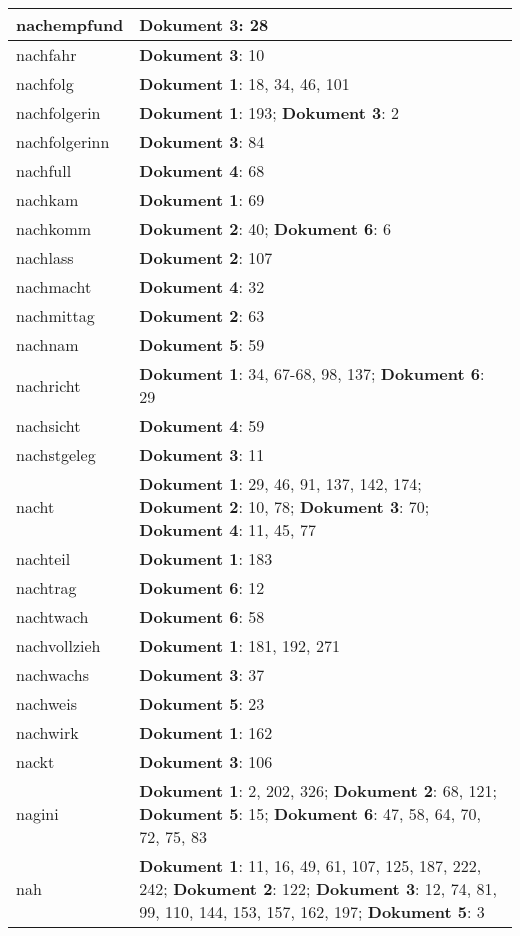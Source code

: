\documentclass[a5paper]{article}
\begin{document}
\begin{longtable}[l]{|l|p{3in}|}
\hline
nachempfund & \textbf{Dokument 3}: 28 \\
\hline
nachfahr & \textbf{Dokument 3}: 10 \\
\hline
nachfolg & \textbf{Dokument 1}: 18, 34, 46, 101 \\
\hline
nachfolgerin & \textbf{Dokument 1}: 193; \textbf{Dokument 3}: 2 \\
\hline
nachfolgerinn & \textbf{Dokument 3}: 84 \\
\hline
nachfull & \textbf{Dokument 4}: 68 \\
\hline
nachkam & \textbf{Dokument 1}: 69 \\
\hline
nachkomm & \textbf{Dokument 2}: 40; \textbf{Dokument 6}: 6 \\
\hline
nachlass & \textbf{Dokument 2}: 107 \\
\hline
nachmacht & \textbf{Dokument 4}: 32 \\
\hline
nachmittag & \textbf{Dokument 2}: 63 \\
\hline
nachnam & \textbf{Dokument 5}: 59 \\
\hline
nachricht & \textbf{Dokument 1}: 34, 67-68, 98, 137; \textbf{Dokument 6}: 29 \\
\hline
nachsicht & \textbf{Dokument 4}: 59 \\
\hline
nachstgeleg & \textbf{Dokument 3}: 11 \\
\hline
nacht & \textbf{Dokument 1}: 29, 46, 91, 137, 142, 174; \textbf{Dokument 2}: 10, 78; \textbf{Dokument 3}: 70; \textbf{Dokument 4}: 11, 45, 77 \\
\hline
nachteil & \textbf{Dokument 1}: 183 \\
\hline
nachtrag & \textbf{Dokument 6}: 12 \\
\hline
nachtwach & \textbf{Dokument 6}: 58 \\
\hline
nachvollzieh & \textbf{Dokument 1}: 181, 192, 271 \\
\hline
nachwachs & \textbf{Dokument 3}: 37 \\
\hline
nachweis & \textbf{Dokument 5}: 23 \\
\hline
nachwirk & \textbf{Dokument 1}: 162 \\
\hline
nackt & \textbf{Dokument 3}: 106 \\
\hline
nagini & \textbf{Dokument 1}: 2, 202, 326; \textbf{Dokument 2}: 68, 121; \textbf{Dokument 5}: 15; \textbf{Dokument 6}: 47, 58, 64, 70, 72, 75, 83 \\
\hline
nah & \textbf{Dokument 1}: 11, 16, 49, 61, 107, 125, 187, 222, 242; \textbf{Dokument 2}: 122; \textbf{Dokument 3}: 12, 74, 81, 99, 110, 144, 153, 157, 162, 197; \textbf{Dokument 5}: 3 \\

\end{longtable}
\end{document}

